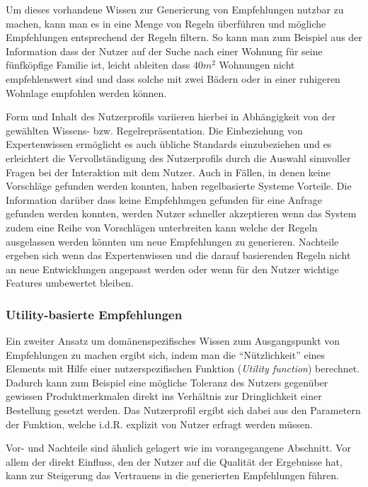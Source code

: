Um dieses vorhandene Wissen zur Generierung von Empfehlungen nutzbar zu machen, kann man es in eine Menge von Regeln überführen und mögliche Empfehlungen entsprechend der Regeln filtern. So kann man zum Beispiel aus der Information dass der Nutzer auf der Suche nach einer Wohnung für seine fünfköpfige Familie ist, leicht ableiten dass 40$m^{2}$ Wohnungen nicht empfehlenswert sind und dass solche mit zwei Bädern oder in einer ruhigeren Wohnlage empfohlen werden können.

Form und Inhalt des Nutzerprofils variieren hierbei in Abhängigkeit von der gewählten Wissens- bzw. Regelrepräsentation. Die Einbeziehung von Expertenwissen ermöglicht es auch übliche Standards einzubeziehen und es erleichtert die Vervollständigung des Nutzerprofils durch die Auswahl sinnvoller Fragen bei der Interaktion mit dem Nutzer. Auch in Fällen, in denen keine Vorschläge gefunden werden konnten, haben regelbasierte Systeme Vorteile. Die Information darüber dass keine Empfehlungen gefunden für eine Anfrage gefunden werden konnten, werden Nutzer schneller akzeptieren wenn das System zudem eine Reihe von Vorschlägen unterbreiten kann welche der Regeln ausgelassen werden könnten um neue Empfehlungen zu generieren. Nachteile ergeben sich wenn das Expertenwissen und die darauf basierenden Regeln nicht an neue Entwicklungen angepasst werden oder wenn für den Nutzer wichtige Features umbewertet bleiben. \citep[Kap. 4]{rs}

\subsubsection{Utility-basierte Empfehlungen}

Ein zweiter Ansatz um domänenspezifisches Wissen zum Ausgangspunkt von Empfehlungen zu machen ergibt sich, indem man die ``Nützlichkeit'' eines Elements mit Hilfe einer nutzerspezifischen Funktion (\textit{Utility function}) berechnet. Dadurch kann zum Beispiel eine mögliche Toleranz des Nutzers gegenüber gewissen Produktmerkmalen direkt ins Verhältnis zur Dringlichkeit einer Bestellung gesetzt werden. Das Nutzerprofil ergibt sich dabei aus den Parametern der Funktion, welche i.d.R. explizit von Nutzer erfragt werden müssen.

Vor- und Nachteile sind ähnlich gelagert wie im vorangegangene Abschnitt. Vor allem der direkt Einfluss, den der Nutzer auf die Qualität der Ergebnisse hat, kann zur Steigerung das Vertrauens in die generierten Empfehlungen führen.  \citep[Kap. 1]{hb} \citep{Burke:2002:HRS:586321.586352, hb_20}





